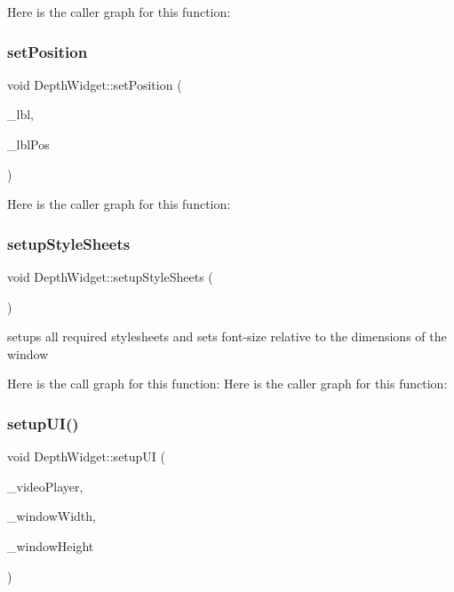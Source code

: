 Here is the caller graph for this function\+:
\mbox{\label{class_depth_widget_af211eeb4ae068a45a5ed08f445cadf10}} 
\subsubsection{\texorpdfstring{set\+Position}{setPosition}}
{\footnotesize\ttfamily void Depth\+Widget\+::set\+Position (\begin{DoxyParamCaption}\item[{Q\+Label $\ast$}]{\+\_\+lbl,  }\item[{\mbox{\hyperlink{class_position}{Position}} $\ast$}]{\+\_\+lbl\+Pos }\end{DoxyParamCaption})\hspace{0.3cm}{\ttfamily [slot]}}

Here is the caller graph for this function\+:
\mbox{\label{class_depth_widget_ae0988973b723b0d5e89424353c64f916}} 
\subsubsection{\texorpdfstring{setup\+Style\+Sheets}{setupStyleSheets}}
{\footnotesize\ttfamily void Depth\+Widget\+::setup\+Style\+Sheets (\begin{DoxyParamCaption}{ }\end{DoxyParamCaption})\hspace{0.3cm}{\ttfamily [slot]}}



setups all required stylesheets and sets font-\/size relative to the dimensions of the window 

Here is the call graph for this function\+:
Here is the caller graph for this function\+:
\mbox{\label{class_depth_widget_ae03d5522882f541f0779adc95830d60c}} 
\subsubsection{\texorpdfstring{setup\+U\+I()}{setupUI()}}
{\footnotesize\ttfamily void Depth\+Widget\+::setup\+UI (\begin{DoxyParamCaption}\item[{Q\+Widget $\ast$}]{\+\_\+video\+Player,  }\item[{int $\ast$}]{\+\_\+window\+Width,  }\item[{int $\ast$}]{\+\_\+window\+Height }\end{DoxyParamCaption})}

